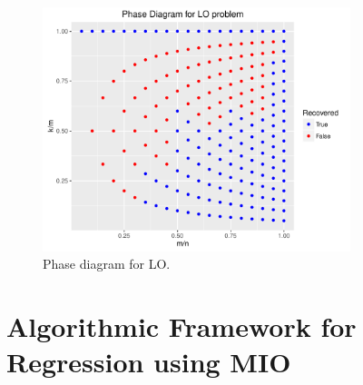 \documentclass[12pt]{article}
\newcommand{\1}{\mathds{1}}
\begin{document}
\begin{figure}[tb]
  \centering
  \includegraphics[width=0.8\textwidth]{figures/phase_LO}
  \caption{Phase diagram for LO.}\label{fig:LO_phase}
\end{figure}

\section{Algorithmic Framework for Regression using MIO}
\end{document}
